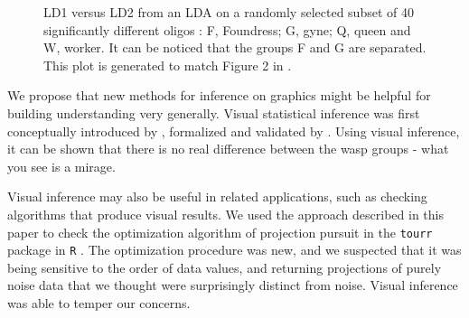 \begin{figure}[hbtp]
   \centering
       \caption{LD1 versus LD2 from an LDA on a randomly selected subset of 40 significantly different oligos : F, Foundress; G, gyne; Q, queen and W, worker. It can be noticed that the groups F and G are separated. This plot is generated to match Figure 2 in \cite{toth:2010}. }
     \label{oligo}
\end{figure}  

We propose that new methods for inference on graphics might be helpful for building understanding very generally. Visual statistical inference was first conceptually introduced by \cite{buja:2009}, formalized and validated by \cite{majumder:2013}. Using visual inference, it can be shown that there is no real difference between the wasp groups - what you see is a mirage. 

Visual inference may also be useful in related applications, such as checking algorithms that produce visual results. We used the approach described in this paper to check the optimization algorithm of projection pursuit in the \texttt{tourr} package \citep{tourr:2011} in \texttt{R} \citep{r}. The optimization procedure was new, and we suspected that it was being sensitive to the order of data values, and returning projections of purely noise data that we thought were surprisingly distinct from noise. Visual inference was able to temper our concerns.   

